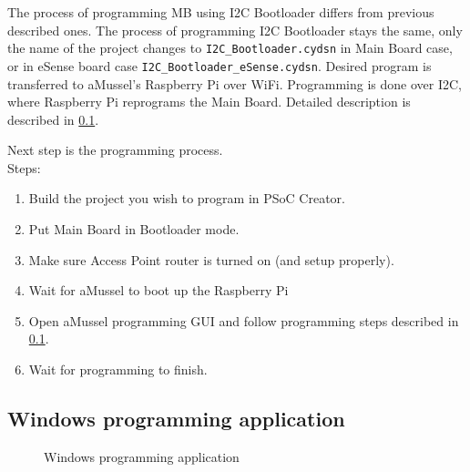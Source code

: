 The process of programming MB using I2C Bootloader differs from previous described ones.
The process of programming I2C Bootloader stays the same, only the name of the project changes to \texttt{I2C\_Bootloader.cydsn} in Main Board case, or in eSense board case \texttt{I2C\_Bootloader\_eSense.cydsn}.
Desired program is transferred to aMussel's Raspberry Pi over WiFi.
Programming is done over I2C, where Raspberry Pi reprograms the Main Board.
Detailed description is described in \ref{subsec:win_prog_app}.


Next step is the programming process.\\
Steps:
\begin{enumerate}
	\item Build the project you wish to program in PSoC Creator.
	\item Put Main Board in Bootloader mode.
	\item Make sure Access Point router is turned on (and setup properly).
	\item Wait for aMussel to boot up the Raspberry Pi 
	\item Open aMussel programming GUI and follow programming steps described in \ref{subsec:win_prog_app}.
	\item Wait for programming to finish.
\end{enumerate}

\subsection{Windows programming application}
\label{subsec:win_prog_app}

\begin{figure} [h!]
{}
\label{subflo:windows_programming_application_main}
\hfill
{}
\hfill
{}
\vfill
{}
\hfill
{}
\hfill
{}
\caption{Windows programming application}
\label{fig:windows_programming_application}
\end{figure}

